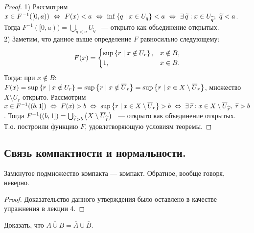 \begin{proof}
            1) Рассмотрим $x \in F^{-1}([0, a)) \ \Leftrightarrow \ F(x) < a \ \Leftrightarrow \ \inf\cbr{q \mid x \in U_q} < a \ \Leftrightarrow \ \exists \, \widetilde{q}: x \in U_{\widetilde{q}}, \ \widetilde{q} < a$. Тогда $F^{-1}([0, a)) = \bigcup_{\widetilde{q} < a} U_{\widetilde{q}}$ \ --- открыто как объединение открытых. \\
            2) Заметим, что данное выше определение $F$ равносильно следующему: 
            \[
                F(x) = 
                    \begin{cases}
                        \sup\left\{r \mid x \notin U_r\right\}, & x \notin B, \\
                        1, & x \in B.
                    \end{cases}
            \]
            Тогда: при $x \not\in B$: $F(x) = \sup\left\{r \mid x \notin U_r\right\} = \sup\left\{r \mid x \notin \overline{U}_r\right\} = \sup\left\{r \mid x \in X \setminus \overline{U}_r\right\}$, множество $X \setminus \overline{U}_r$ открыто. Рассмотрим $x \in F^{-1}((b, 1]) \ \Leftrightarrow \ F(x) > b \ \Leftrightarrow \ \sup\cbr{r \mid x \in X \setminus \overline{U}_r} > b \ \Leftrightarrow \ \exists \, \widetilde{r}: x \in X \setminus \overline{U}_{\widetilde{r}}, \ \widetilde{r} > b$. Тогда $F^{-1}((b, 1]) = \bigcup_{\widetilde{r} > b} \left(X \setminus \overline{U}_{\widetilde{r}}\right)$ \ --- открыто как объединение открытых. \\
            Т.о. построили функцию $F$, удовлетворяющую условиям теоремы.
\end{proof}

\subsection{Связь компактности и нормальности.}

\begin{statement}
    Замкнутое подмножество компакта --- компакт. Обратное, вообще говоря, неверно.
\end{statement}
\begin{proof}
    Доказательство данного утверждения было оставлено в качестве упражнения в лекции 4. 
\end{proof}

\begin{exercise}
    Доказать, что $\overline{A \cup B} = \overline{A} \cup \overline{B}$.
\end{exercise}

